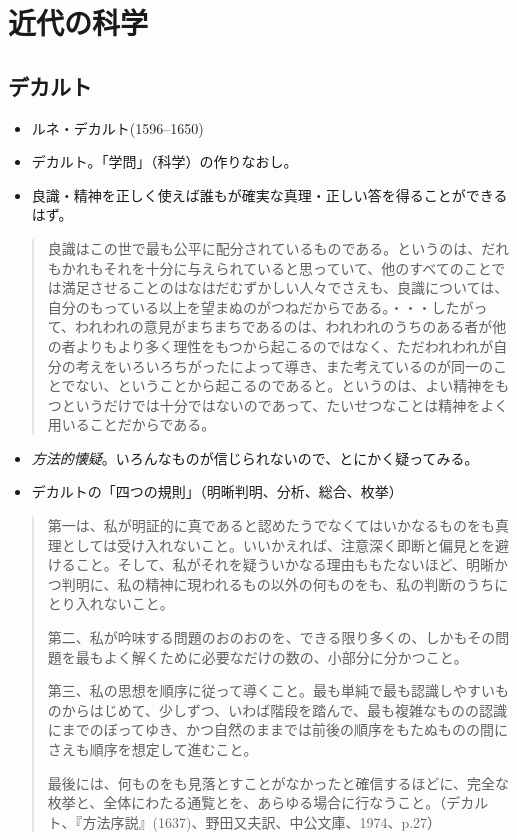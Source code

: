 
\chapter{近代の科学}



\section{デカルト}

\begin{itemize}
\item ルネ・デカルト(1596--1650)
\item デカルト。「学問」（科学）の作りなおし。
\item 良識・精神を正しく使えば誰もが確実な真理・正しい答を得ることができるはず。
\end{itemize}

\begin{quote}
    良識はこの世で最も公平に配分されているものである。というのは、だれもかれもそれを十分に与えられていると思っていて、他のすべてのことでは満足させることのはなはだむずかしい人々でさえも、良識については、自分のもっている以上を望まぬのがつねだからである。・・・したがって、われわれの意見がまちまちであるのは、われわれのうちのある者が他の者よりもより多く理性をもつから起こるのではなく、ただわれわれが自分の考えをいろいろちがったによって導き、また考えているのが同一のことでない、ということから起こるのであると。というのは、よい精神をもつというだけでは十分ではないのであって、たいせつなことは精神をよく用いることだからである。
  \end{quote}

\begin{itemize}
\item \emph{方法的懐疑}。いろんなものが信じられないので、とにかく疑ってみる。
\item デカルトの「四つの規則」（明晰判明、分析、総合、枚挙）
\end{itemize}

\begin{quotation}
    第一は、私が明証的に真であると認めたうでなくてはいかなるものをも真理としては受け入れないこと。いいかえれば、注意深く即断と偏見とを避けること。そして、私がそれを疑ういかなる理由ももたないほど、明晰かつ判明に、私の精神に現われるもの以外の何ものをも、私の判断のうちにとり入れないこと。

    第二、私が吟味する問題のおのおのを、できる限り多くの、しかもその問題を最もよく解くために必要なだけの数の、小部分に分かつこと。

    第三、私の思想を順序に従って導くこと。最も単純で最も認識しやすいものからはじめて、少しずつ、いわば階段を踏んで、最も複雑なものの認識にまでのぼってゆき、かつ自然のままでは前後の順序をもたぬものの間にさえも順序を想定して進むこと。

    最後には、何ものをも見落とすことがなかったと確信するほどに、完全な枚挙と、全体にわたる通覧とを、あらゆる場合に行なうこと。（デカルト、『方法序説』(1637)、野田又夫訳、中公文庫、1974、p.27）
  \end{quotation}
  







